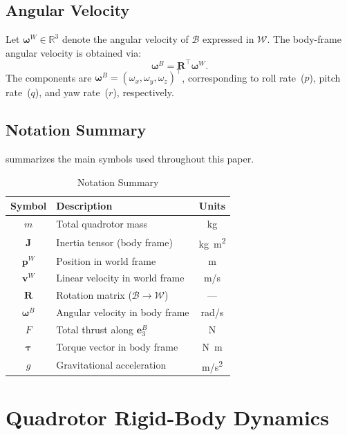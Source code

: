 \documentclass[journal]{IEEEtran}
\newcommand{\R}{\mathbf{R}}
\newcommand{\J}{\mathbf{J}}
\newcommand{\bomega}{\boldsymbol{\omega}}
\newcommand{\btau}{\boldsymbol{\tau}}
\begin{document}
\subsection{Angular Velocity}

Let $\bomega^W \in \mathbb{R}^3$ denote the angular velocity of $\mathcal{B}$ expressed in $\mathcal{W}$. The body-frame angular velocity is obtained via:
\begin{equation}
  \bomega^B = \R^\top \bomega^W.
  \label{eq:omega_body}
\end{equation}
The components are $\bomega^B = (\omega_x, \omega_y, \omega_z)^\top$, corresponding to roll rate~($p$), pitch rate~($q$), and yaw rate~($r$), respectively.

\subsection{Notation Summary}

 summarizes the main symbols used throughout this paper.

\begin{table}[!t]
  \centering
  \caption{Notation Summary}
  \label{tab:notation}
  \begin{tabular}{@{}clc@{}}
    \toprule
    Symbol & Description & Units \\
    \midrule
    $m$ & Total quadrotor mass & \si{kg} \\
    $\J$ & Inertia tensor (body frame) & \si{kg.m^2} \\
    $\mathbf{p}^W$ & Position in world frame & \si{m} \\
    $\mathbf{v}^W$ & Linear velocity in world frame & \si{m/s} \\
    $\R$ & Rotation matrix ($\mathcal{B} \to \mathcal{W}$) & --- \\
    $\bomega^B$ & Angular velocity in body frame & \si{rad/s} \\
    $F$ & Total thrust along $\mathbf{e}_3^B$ & \si{N} \\
    $\btau$ & Torque vector in body frame & \si{N.m} \\
    $g$ & Gravitational acceleration & \si{m/s^2} \\
    \bottomrule
  \end{tabular}
\end{table}


\section{Quadrotor Rigid-Body Dynamics}
\label{sec:dynamics}
\end{document}
